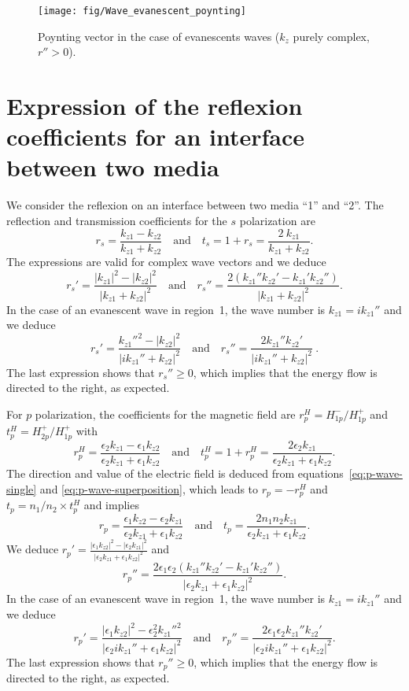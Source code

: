 \begin{figure}[!h]
\texttt{[image: fig/Wave\_evanescent\_poynting]}
\caption{\label{fig:Wave_evanescent_poynting}Poynting vector in the case of evanescents waves ($k_z$ purely complex, $r''>0$).}
\end{figure}

\section{Expression of the reflexion coefficients for an interface between two media}

We consider the reflexion on an interface between two media ``1'' and ``2''.
The reflection and transmission coefficients for the $s$ polarization are\cite{Wikipedia_Fresnel}
$$
r_s = \frac{k_{z1}-k_{z2}}{k_{z1}+k_{z2}} 
\quad\textrm{and}\quad
t_s = 1 + r_s = \frac{2\ k_{z1}}{k_{z1}+k_{z2}}.
$$
The expressions are valid for complex wave vectors and we deduce
$$
r_s' = \frac{|k_{z1}|^2 - |k_{z2}|^2}{|k_{z1} + k_{z2}|^2}
\quad\textrm{and}\quad
r_s'' = \frac{2 (k_{z1}'' k_{z2}' - k_{z1}' k_{z2}'')}{|k_{z1} + k_{z2}|^2}.
$$
In the case of an evanescent wave in region~1, the wave number is $k_{z1} = i k_{z1}''$ and we deduce
$$
r_s' = \frac{k_{z1}''^2 - |k_{z2}|^2}{|ik_{z1}'' + k_{z2}|^2}
\quad\textrm{and}\quad
r_s'' = \frac{2 k_{z1}'' k_{z2}'}{|ik_{z1}'' + k_{z2}|^2}
\ .
$$
The last expression shows that $r_s'' \ge 0$, which implies that the energy flow is directed to the right, as expected.

For $p$ polarization, the coefficients for the magnetic field are
$r^H_p = H^-_{1p} / H^+_{1p}$ and $t^H_p = H^+_{2p} / H^+_{1p}$ with
$$
r^H_p=\frac{\epsilon_2k_{z1}-\epsilon_1k_{z2}}{\epsilon_2k_{z1}+\epsilon_1k_{z2}}
\quad\textrm{and}\quad
t^H_p = 1+r^H_p = \frac{2\epsilon_2 k_{z1}}{\epsilon_2k_{z1}+\epsilon_1k_{z2}}
.
$$
The direction and value of the electric field is deduced from equations~\ref{eq:p-wave-single} and \ref{eq:p-wave-superposition}, which leads to $r_p=-r^H_p$ and $t_p = n_1/n_2 \times t^H_p$ and implies \cite{Wikipedia_Fresnel}
$$
r_p=
\frac{\epsilon_1k_{z2} - \epsilon_2k_{z1}}{\epsilon_2k_{z1}+\epsilon_1k_{z2}}
\quad\textrm{and}\quad 
t_p = 
\frac{2 n_1 n_2 k_{z1}}{\epsilon_2k_{z1}+\epsilon_1k_{z2}}.
$$
We deduce
$ \displaystyle
r_p' = \frac{|\epsilon_1 k_{z2}|^2 - |\epsilon_2 k_{z1}|^2}{|\epsilon_2 k_{z1} + \epsilon_1 k_{z2}|^2}$ 
and
$$
r_p'' = \frac{2 \epsilon_1\epsilon_2(k_{z1}'' k_{z2}' - k_{z1}' k_{z2}'')}{|\epsilon_2 k_{z1} + \epsilon_1 k_{z2}|^2}.
$$
In the case of an evanescent wave in region~1, the wave number is $k_{z1} = i k_{z1}''$ and we deduce
$$
r_p' = \frac{|\epsilon_1 k_{z2}|^2 - \epsilon_2^2 k_{z1}''^2}{|\epsilon_2 i k_{z1}'' + \epsilon_1 k_{z2}|^2}
\quad\textrm{and}\quad
r_p'' =  \frac{2 \epsilon_1\epsilon_2 k_{z1}'' k_{z2}'}{|\epsilon_2 i k_{z1}'' + \epsilon_1 k_{z2}|^2}
.
$$
The last expression shows that $r_p''\ge 0$, which implies that the energy flow is directed to the right, as expected.


